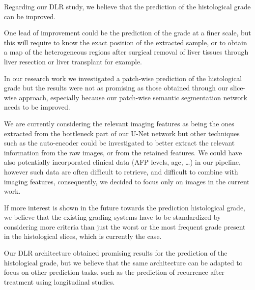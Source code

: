 Regarding our DLR study, we believe that the prediction of the
histological grade can be improved.

One lead of improvement could be the prediction of the grade at a finer
scale, but this will require to know the exact position of the extracted
sample, or to obtain a map of the heterogeneous regions after surgical
removal of liver tissues through liver resection or liver transplant for
example.

In our research work we investigated a patch-wise prediction of the
histological grade but the results were not as promising as those
obtained through our slice-wise approach, especially because our
patch-wise semantic segmentation network needs to be improved.

We are currently considering the relevant imaging features as being the
ones extracted from the bottleneck part of our U-Net network but other
techniques such as the auto-encoder could be investigated to better
extract the relevant information from the raw images, or from the
retained features. We could have also potentially incorporated clinical
data (AFP levels, age, \ldots{}) in our pipeline, however such data are
often difficult to retrieve, and difficult to combine with imaging
features, consequently, we decided to focus only on images in the
current work.

If more interest is shown in the future towards the prediction
histological grade, we believe that the existing grading systems have to
be standardized by considering more criteria than just the worst or the
most frequent grade present in the histological slices, which is
currently the case.

Our DLR architecture obtained promising results for the prediction of
the histological grade, but we believe that the same architecture can be
adapted to focus on other prediction tasks, such as the prediction of
recurrence after treatment using longitudinal studies.
